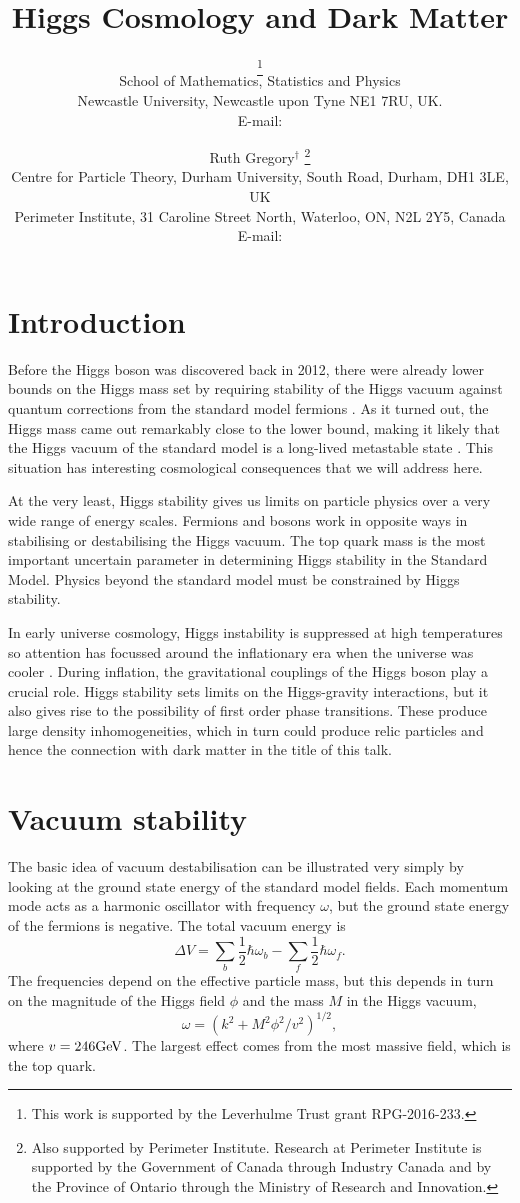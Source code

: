 \documentclass{PoS}
\title{Higgs Cosmology and Dark Matter}
\author{\speaker{Ian G. Moss}\thanks{This work is supported by the Leverhulme Trust grant RPG-2016-233.}\\
        School of Mathematics, Statistics and Physics\\
       Newcastle University, Newcastle upon Tyne NE1 7RU, UK.\\
        E-mail: \email{ian.moss@ncl.ac.uk}}
\author{Ruth Gregory$^\dagger$
\thanks{Also supported by Perimeter Institute. Research at Perimeter 
Institute is supported by the Government of
Canada through Industry Canada and by the Province of Ontario through the
Ministry of Research and Innovation.}\\
Centre for Particle Theory, Durham University,
South Road, Durham, DH1 3LE, UK\\
Perimeter Institute, 31 Caroline Street North, Waterloo, 
ON, N2L 2Y5, Canada\\
        E-mail: \email{r.a.w.gregory@durham.ac.uk}}
\begin{document}
\section{Introduction}

Before the Higgs boson was discovered back in 2012, there were already
lower bounds on the Higgs mass set by requiring stability of the Higgs vacuum
against quantum corrections from the standard model fermions \cite{Degrassi:2012ry}.
As it turned out, the Higgs mass came out remarkably close to the lower bound,
making it likely that the Higgs vacuum of the standard model is a long-lived metastable state
\cite{Blum:2015rpa}. 
This situation has interesting cosmological consequences that we will address here.

At the very least, Higgs stability gives us limits on particle physics over a very wide
range of energy scales. Fermions and bosons work in opposite ways in stabilising
or destabilising the Higgs vacuum. The top quark mass is the most important uncertain
parameter in determining Higgs stability in the Standard Model. Physics beyond
the standard model must be constrained by Higgs stability.

In early universe cosmology, Higgs instability is suppressed at high temperatures so attention has focussed 
around the inflationary era when the universe was cooler \cite{Espinosa:2007qp,EliasMiro:2011aa}. 
During inflation, the gravitational couplings
of the Higgs boson play a crucial role. Higgs stability sets limits on the Higgs-gravity interactions,
but it also gives rise to the possibility of first order phase transitions. These produce
large density inhomogeneities, which in turn could produce relic particles and hence the connection
with dark matter in the title of this talk.

\section{Vacuum stability}

The basic idea of vacuum destabilisation can be illustrated very simply by looking at the
ground state energy of the standard model fields. Each momentum mode acts as a harmonic oscillator
with frequency $\omega$, but the ground state energy of the fermions is negative. The total
vacuum energy is
\begin{equation}
\Delta V=\sum_b\frac12\hbar\omega_b-\sum_f\frac12\hbar\omega_f.
\end{equation}
The frequencies depend on the effective particle mass, but this depends in turn on the
magnitude of the Higgs field $\phi$ and the mass $M$ in the Higgs vacuum,
\begin{equation}
\omega=(k^2+M^2\phi^2/v^2)^{1/2},
\end{equation}
where $v=246{\rm GeV}$. The largest effect comes from the most massive field,
which is the top quark. 
\end{document}
